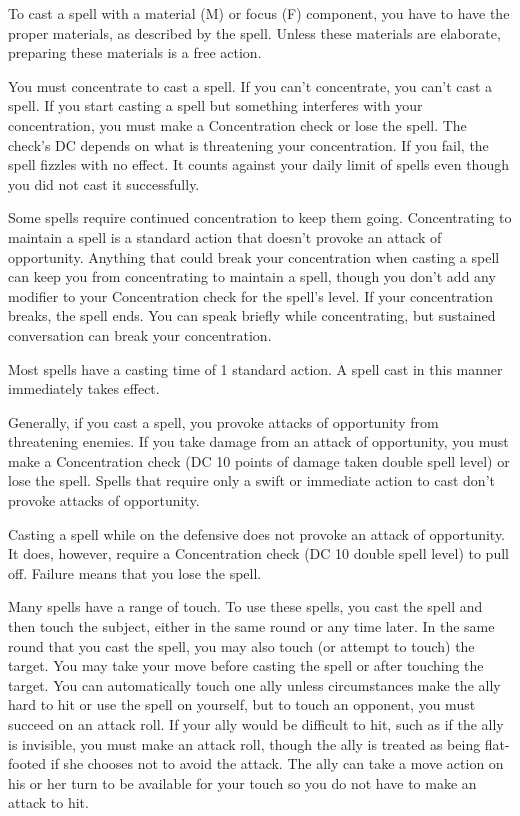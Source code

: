 To cast a spell with a material (M) or focus (F) component, you have to have the proper materials, as described by the spell. Unless these materials are elaborate, preparing these materials is a free action.

 You must concentrate to cast a spell. If you can't concentrate, you can't cast a spell. If you start casting a spell but something interferes with your concentration, you must make a Concentration check or lose the spell. The check's DC depends on what is threatening your concentration. If you fail, the spell fizzles with no effect. It counts against your daily limit of spells even though you did not cast it successfully.

 Some spells require continued concentration to keep them going. Concentrating to maintain a spell is a standard action that doesn't provoke an attack of opportunity. Anything that could break your concentration when casting a spell can keep you from concentrating to maintain a spell, though you don't add any modifier to your Concentration check for the spell's level. If your concentration breaks, the spell ends. You can speak briefly while concentrating, but sustained conversation can break your concentration.

 Most spells have a casting time of 1 standard action. A spell cast in this manner immediately takes effect.

 Generally, if you cast a spell, you provoke attacks of opportunity from threatening enemies. If you take damage from an attack of opportunity, you must make a Concentration check (DC 10 \add points of damage taken \add double spell level) or lose the spell. Spells that require only a swift or immediate action to cast don't provoke attacks of opportunity.

 Casting a spell while on the defensive does not provoke an attack of opportunity. It does, however, require a Concentration check (DC 10 \add double spell level) to pull off. Failure means that you lose the spell.

 Many spells have a range of touch. To use these spells, you cast the spell and then touch the subject, either in the same round or any time later. In the same round that you cast the spell, you may also touch (or attempt to touch) the target. You may take your move before casting the spell or after touching the target. You can automatically touch one ally unless circumstances make the ally hard to hit or use the spell on yourself, but to touch an opponent, you must succeed on an attack roll. If your ally would be difficult to hit, such as if the ally is invisible, you must make an attack roll, though the ally is treated as being flat-footed if she chooses not to avoid the attack. The ally can take a move action on his or her turn to be available for your touch so you do not have to make an attack to hit.

